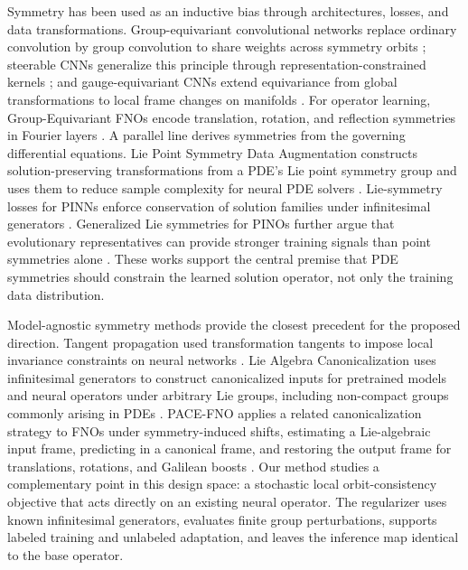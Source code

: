 Symmetry has been used as an inductive bias through architectures, losses, and data transformations. Group-equivariant convolutional networks replace ordinary convolution by group convolution to share weights across symmetry orbits \citep{cohen2016gcnn}; steerable CNNs generalize this principle through representation-constrained kernels \citep{weiler2019e2cnn}; and gauge-equivariant CNNs extend equivariance from global transformations to local frame changes on manifolds \citep{cohen2019gauge}. For operator learning, Group-Equivariant FNOs encode translation, rotation, and reflection symmetries in Fourier layers \citep{helwig2023gfno}. A parallel line derives symmetries from the governing differential equations. Lie Point Symmetry Data Augmentation constructs solution-preserving transformations from a PDE's Lie point symmetry group and uses them to reduce sample complexity for neural PDE solvers \citep{brandstetter2022lpsda}. Lie-symmetry losses for PINNs enforce conservation of solution families under infinitesimal generators \citep{akhoundsadegh2023liepinn}. Generalized Lie symmetries for PINOs further argue that evolutionary representatives can provide stronger training signals than point symmetries alone \citep{wang2025generalizedliepino}. These works support the central premise that PDE symmetries should constrain the learned solution operator, not only the training data distribution.

Model-agnostic symmetry methods provide the closest precedent for the proposed direction. Tangent propagation used transformation tangents to impose local invariance constraints on neural networks \citep{simard1991tangentprop}. Lie Algebra Canonicalization uses infinitesimal generators to construct canonicalized inputs for pretrained models and neural operators under arbitrary Lie groups, including non-compact groups commonly arising in PDEs \citep{shumaylov2025lielac}. PACE-FNO applies a related canonicalization strategy to FNOs under symmetry-induced shifts, estimating a Lie-algebraic input frame, predicting in a canonical frame, and restoring the output frame for translations, rotations, and Galilean boosts \citep{xu2026pacefno}. Our method studies a complementary point in this design space: a stochastic local orbit-consistency objective that acts directly on an existing neural operator. The regularizer uses known infinitesimal generators, evaluates finite group perturbations, supports labeled training and unlabeled adaptation, and leaves the inference map identical to the base operator.
